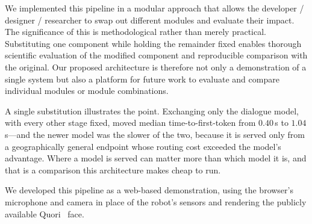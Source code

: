 \documentclass[conference]{IEEEtran}
\begin{document}
We implemented this pipeline in a modular approach that allows the developer / designer / researcher to swap out different modules and evaluate their impact. The
significance of this is methodological rather than merely practical.
Substituting one component while holding the remainder fixed enables thorough scientific evaluation of the modified component and reproducible comparison with the original. Our proposed architecture is therefore not only a demonstration of a single system but also a platform for future work to evaluate and compare individual modules or module combinations.

A single substitution illustrates the point. Exchanging only the dialogue
model, with every other stage fixed, moved median time-to-first-token from
$0.40$\,s to $1.04$\,s---and the newer model was the slower of the two,
because it is served only from a geographically general endpoint whose routing
cost exceeded the model's advantage. Where a model is served can matter more
than which model it is, and that is a comparison this architecture makes cheap
to run.

We developed this pipeline as a web-based demonstration, using the browser's
microphone and camera in place of the robot's sensors and rendering the
publicly available Quori~\cite{specian2021quori} face.

\end{document}
